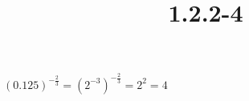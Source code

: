 \documentclass{article}
\title{1.2.2-4}
\begin{document}
\maketitle

\( (0.125)^{-\frac{2}{3}} = (2^{-3})^{-\frac{2}{3}} = 2^2 = 4 \)
\end{document}
